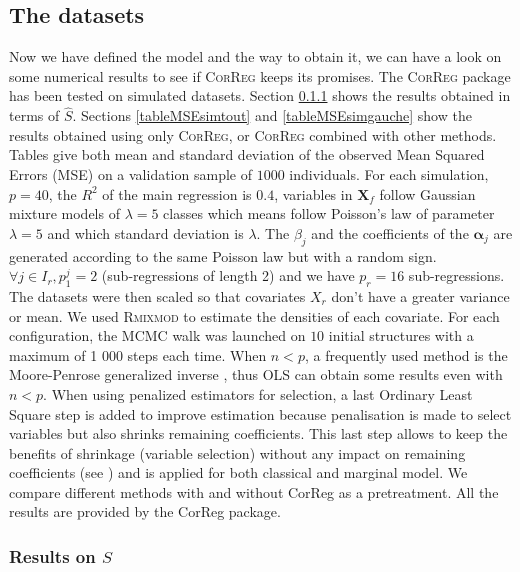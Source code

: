\documentclass[11pt,a4paper]{report}
\begin{document}
	\subsection{The datasets}	
	Now we have defined the model and the way to obtain it, we can have a look on some numerical results to see if \textsc{CorReg} 	keeps its promises.
	The \textsc{CorReg} package has been tested on simulated datasets. 
Section \ref{compZ} shows the results obtained in terms of $\hat{S}$. Sections \ref{tableMSEsimtout} and \ref{tableMSEsimgauche} show the results obtained using only \textsc{CorReg}, or \textsc{CorReg} combined with other methods. Tables give both mean and standard deviation of the observed Mean Squared Errors (MSE) on a validation sample of $1 000$ individuals. For each simulation,  $p=40$, the $R^2$ of the main regression is $0.4$, variables in $\boldsymbol{X}_f$ follow Gaussian mixture models of $\lambda=5$ classes which means follow Poisson's law of parameter $\lambda=5$ and which standard deviation is $\lambda$. The $\beta_j$ and the coefficients of the $\boldsymbol{\alpha}_j$ are generated according to the same Poisson law but with a random sign. $\forall j \in I_r, p_1^j=2$ (sub-regressions of length 2) and we have $p_r=16$ sub-regressions. The datasets were then scaled so that covariates $X_r$ don't have a greater variance or mean.
	We used \textsc{Rmixmod} to estimate the densities of each covariate. For each configuration, the MCMC walk was launched on $10$ initial structures with a maximum of 1 000 steps each time.
	When $n<p$, a frequently used method is the Moore-Penrose generalized inverse \cite{katsikis2008fast}, thus OLS can obtain some results even with $n<p$. %
	When using penalized estimators for selection, a last Ordinary Least Square step is added to improve estimation because penalisation is made to select variables but also shrinks remaining coefficients. This last step allows to keep the benefits of shrinkage (variable selection) without any impact on remaining coefficients (see \cite{SAM10088}) and is applied for both classical and marginal model.
	We compare different methods with and without CorReg as a pretreatment. All the results are provided by the CorReg package.
	
		\subsubsection{Results on $\hat S$}	\label{compZ}
\end{document}
